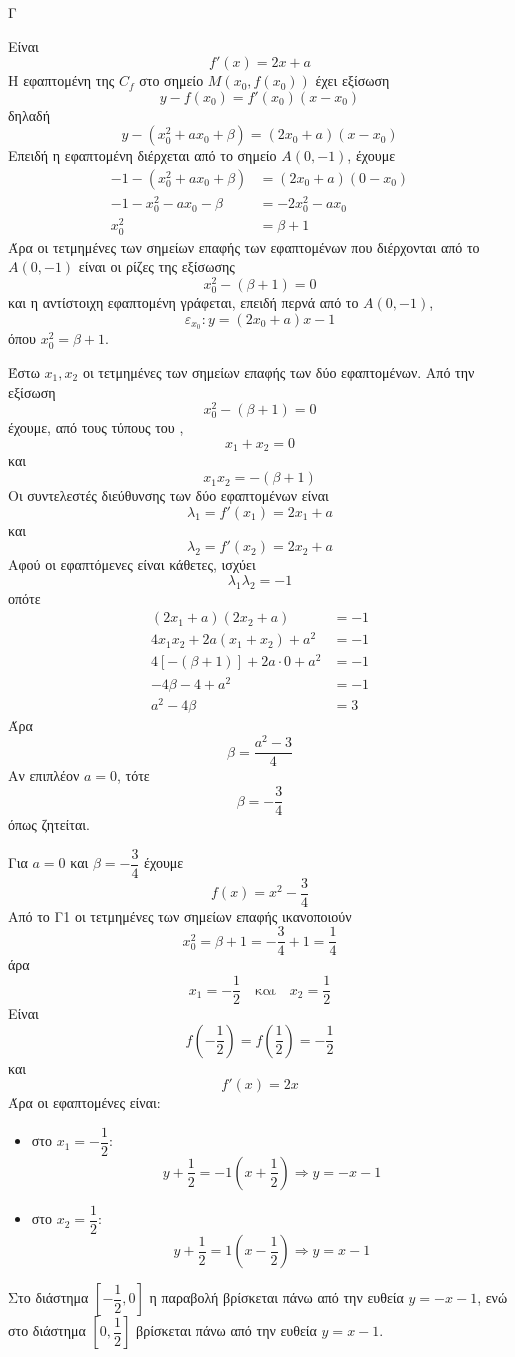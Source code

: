 \begin{thema}{Γ}
\begin{erwthma}
\item Είναι
\[f'(x)=2x+a\]
Η εφαπτομένη της $C_f$ στο σημείο $M(x_0,f(x_0))$ έχει εξίσωση
\[y-f(x_0)=f'(x_0)(x-x_0)\]
δηλαδή
\[y-\left(x_0^2+ax_0+\beta\right)=(2x_0+a)(x-x_0)\]
Επειδή η εφαπτομένη διέρχεται από το σημείο $A(0,-1)$, έχουμε
\begin{align*}
-1-\left(x_0^2+ax_0+\beta\right)&=(2x_0+a)(0-x_0)\\
-1-x_0^2-ax_0-\beta&=-2x_0^2-ax_0\\
x_0^2&=\beta+1
\end{align*}
Άρα οι τετμημένες των σημείων επαφής των εφαπτομένων που διέρχονται από το $A(0,-1)$ είναι οι ρίζες της εξίσωσης
\[x_0^2-(\beta+1)=0\]
και η αντίστοιχη εφαπτομένη γράφεται, επειδή περνά από το $A(0,-1)$,
\[\varepsilon_{x_0}:y=(2x_0+a)x-1\]
όπου $x_0^2=\beta+1$.

\item Έστω $x_1,x_2$ οι τετμημένες των σημείων επαφής των δύο εφαπτομένων.
Από την εξίσωση
\[x_0^2-(\beta+1)=0\]
έχουμε, από τους τύπους του ,
\[x_1+x_2=0\]
και
\[x_1x_2=-(\beta+1)\]
Οι συντελεστές διεύθυνσης των δύο εφαπτομένων είναι
\[\lambda_1=f'(x_1)=2x_1+a\]
και
\[\lambda_2=f'(x_2)=2x_2+a\]
Αφού οι εφαπτόμενες είναι κάθετες, ισχύει
\[\lambda_1\lambda_2=-1\]
οπότε
\begin{align*}
(2x_1+a)(2x_2+a)&=-1\\
4x_1x_2+2a(x_1+x_2)+a^2&=-1\\
4[-(\beta+1)]+2a\cdot 0+a^2&=-1\\
-4\beta-4+a^2&=-1\\
a^2-4\beta&=3
\end{align*}
Άρα
\[\beta=\frac{a^2-3}{4}\]
Αν επιπλέον $a=0$, τότε
\[\beta=-\frac{3}{4}\]
όπως ζητείται.

\item Για $a=0$ και $\beta=-\dfrac{3}{4}$ έχουμε
\[f(x)=x^2-\frac{3}{4}\]
Από το Γ1 οι τετμημένες των σημείων επαφής ικανοποιούν
\[x_0^2=\beta+1=-\frac{3}{4}+1=\frac{1}{4}\]
άρα
\[x_1=-\frac{1}{2}\quad\text{και}\quad x_2=\frac{1}{2}\]
Είναι
\[f\left(-\frac{1}{2}\right)=f\left(\frac{1}{2}\right)=-\frac{1}{2}\]
και
\[f'(x)=2x\]
Άρα οι εφαπτομένες είναι:
\begin{itemize}
\item στο $x_1=-\dfrac{1}{2}$:
\[y+\frac{1}{2}=-1\left(x+\frac{1}{2}\right)\Rightarrow y=-x-1\]
\item στο $x_2=\dfrac{1}{2}$:
\[y+\frac{1}{2}=1\left(x-\frac{1}{2}\right)\Rightarrow y=x-1\]
\end{itemize}
Στο διάστημα $\left[-\dfrac{1}{2},0\right]$ η παραβολή βρίσκεται πάνω από την ευθεία $y=-x-1$, ενώ στο διάστημα $\left[0,\dfrac{1}{2}\right]$ βρίσκεται πάνω από την ευθεία $y=x-1$.


\end{erwthma}
\end{thema}
